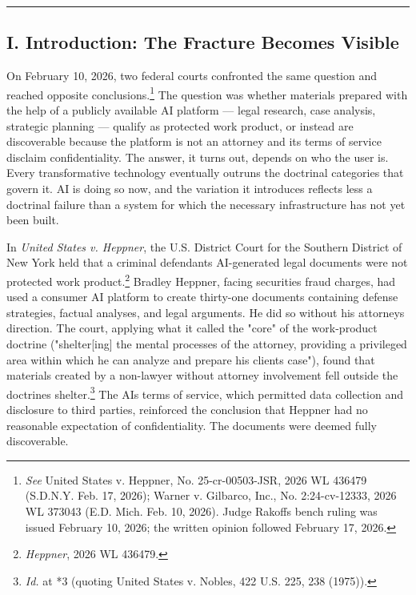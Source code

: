 \documentclass[
  12pt,
]{article}
\begin{document}
\begin{center}\rule{0.5\linewidth}{0.5pt}\end{center}

\subsection{I. Introduction: The Fracture Becomes
Visible}\label{i-introduction-the-fracture-becomes-visible}

On February 10, 2026, two federal courts confronted the same question
and reached opposite conclusions.\footnote{\emph{See} United States v.
  Heppner, No. 25-cr-00503-JSR, 2026 WL 436479 (S.D.N.Y. Feb. 17, 2026);
  Warner v. Gilbarco, Inc., No. 2:24-cv-12333, 2026 WL 373043 (E.D.
  Mich. Feb. 10, 2026). Judge Rakoff\textquotesingle s bench ruling was
  issued February 10, 2026; the written opinion followed February 17,
  2026.} The question was whether materials prepared with the help of a
publicly available AI platform --- legal research, case analysis,
strategic planning --- qualify as protected work product, or instead are
discoverable because the platform is not an attorney and its terms of
service disclaim confidentiality. The answer, it turns out, depends on
who the user is. Every transformative technology eventually outruns the
doctrinal categories that govern it. AI is doing so now, and the
variation it introduces reflects less a doctrinal failure than a system
for which the necessary infrastructure has not yet been built.

In \emph{United States v. Heppner}, the U.S. District Court for the
Southern District of New York held that a criminal
defendant\textquotesingle s AI-generated legal documents were not
protected work product.\footnote{\emph{Heppner}, 2026 WL 436479.}
Bradley Heppner, facing securities fraud charges, had used a consumer AI
platform to create thirty-one documents containing defense strategies,
factual analyses, and legal arguments. He did so without his
attorney\textquotesingle s direction. The court, applying what it called
the "core" of the work-product doctrine ("shelter{[}ing{]} the mental
processes of the attorney, providing a privileged area within which he
can analyze and prepare his client\textquotesingle s case"), found that
materials created by a non-lawyer without attorney involvement fell
outside the doctrine\textquotesingle s shelter.\footnote{\emph{Id.} at
  *3 (quoting United States v. Nobles, 422 U.S. 225, 238 (1975)).} The
AI\textquotesingle s terms of service, which permitted data collection
and disclosure to third parties, reinforced the conclusion that Heppner
had no reasonable expectation of confidentiality. The documents were
deemed fully discoverable.
\end{document}
